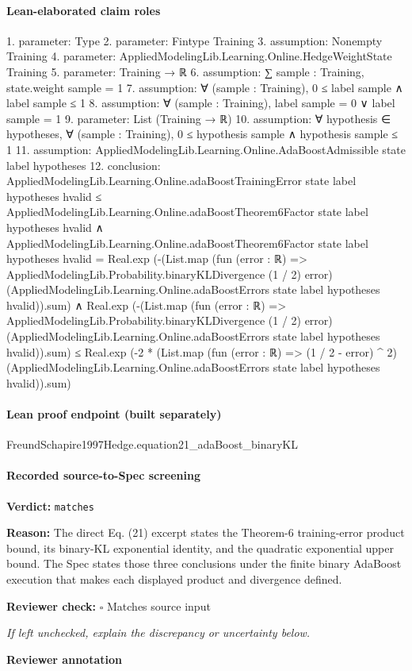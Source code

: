 \documentclass[10pt]{article}
\newcommand{\reviewerbox}{%
  \par\noindent\fbox{\parbox{0.96\linewidth}{\rule{0pt}{0.38in}}}\par
}
\newcommand{\reviewmatch}[1]{%
  \par\noindent\textbf{Reviewer check:} $\square$\; #1\par
  \noindent\emph{If left unchecked, explain the discrepancy or uncertainty below.}\par
}
\begin{document}
\paragraph{Lean-elaborated claim roles}\begin{ReviewVerbatim}
1. parameter: Type
2. parameter: Fintype Training
3. assumption: Nonempty Training
4. parameter: AppliedModelingLib.Learning.Online.HedgeWeightState Training
5. parameter: Training → ℝ
6. assumption: ∑ sample : Training, state.weight sample = 1
7. assumption: ∀ (sample : Training), 0 ≤ label sample ∧ label sample ≤ 1
8. assumption: ∀ (sample : Training), label sample = 0 ∨ label sample = 1
9. parameter: List (Training → ℝ)
10. assumption: ∀ hypothesis ∈ hypotheses, ∀ (sample : Training), 0 ≤ hypothesis sample ∧ hypothesis sample ≤ 1
11. assumption: AppliedModelingLib.Learning.Online.AdaBoostAdmissible state label hypotheses
12. conclusion: AppliedModelingLib.Learning.Online.adaBoostTrainingError state label hypotheses hvalid ≤
    AppliedModelingLib.Learning.Online.adaBoostTheorem6Factor state label hypotheses hvalid ∧
  AppliedModelingLib.Learning.Online.adaBoostTheorem6Factor state label hypotheses hvalid =
      Real.exp
        (-(List.map (fun (error : ℝ) => AppliedModelingLib.Probability.binaryKLDivergence (1 / 2) error)
              (AppliedModelingLib.Learning.Online.adaBoostErrors state label hypotheses hvalid)).sum) ∧
    Real.exp
        (-(List.map (fun (error : ℝ) => AppliedModelingLib.Probability.binaryKLDivergence (1 / 2) error)
              (AppliedModelingLib.Learning.Online.adaBoostErrors state label hypotheses hvalid)).sum) ≤
      Real.exp
        (-2 *
          (List.map (fun (error : ℝ) => (1 / 2 - error) ^ 2)
              (AppliedModelingLib.Learning.Online.adaBoostErrors state label hypotheses hvalid)).sum)
\end{ReviewVerbatim}

\paragraph{Lean proof endpoint (built separately)}\begin{ReviewVerbatim}
FreundSchapire1997Hedge.equation21_adaBoost_binaryKL
\end{ReviewVerbatim}

\paragraph{Recorded source-to-Spec screening}
\textbf{Verdict:} \texttt{matches}
\\
{\raggedright
\textbf{Reason:} The direct Eq.\allowbreak{} (21) excerpt states the Theorem-\allowbreak{}6 training-\allowbreak{}error product bound, its binary-\allowbreak{}KL exponential identity, and the quadratic exponential upper bound.\allowbreak{} The Spec states those three conclusions under the finite binary AdaBoost execution that makes each displayed product and divergence defined.\allowbreak{}
\par}
\reviewmatch{Matches source input}
\noindent\textbf{Reviewer annotation}\par
\reviewerbox
\clearpage
\hypertarget{source-claim-93191e6553024dae}{}
\end{document}
